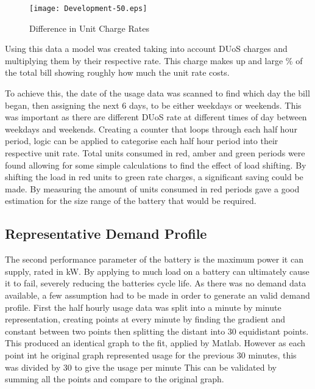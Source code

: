 \begin{figure}[H]
 \centering
 \texttt{[image: Development-50.eps]}
 \caption{Difference in Unit Charge Rates}
 \label{Development-50}
 \end{figure}

Using this data a model was created taking into account DUoS charges and
multiplying them by their respective rate. This charge makes up and
large \% of the total bill showing roughly how much the unit rate costs.

To achieve this, the date of the usage data was scanned to find which
day the bill began, then assigning the next 6 days, to be either
weekdays or weekends. This was important as there are different DUoS
rate at different times of day between weekdays and weekends. Creating a
counter that loops through each half hour period, logic can be applied
to categorise each half hour period into their respective unit rate.
Total units consumed in red, amber and green periods were found allowing
for some simple calculations to find the effect of load shifting. By
shifting the load in red units to green rate charges, a significant
saving could be made. By measuring the amount of units consumed in red
periods gave a good estimation for the size range of the battery that
would be required.

\subsection{Representative Demand
Profile}\label{representative-demand-profile}

The second performance parameter of the battery is the maximum power it
can supply, rated in kW. By applying to much load on a battery can
ultimately cause it to fail, severely reducing the batteries cycle life.
As there was no demand data available, a few assumption had to be made
in order to generate an valid demand profile. First the half hourly
usage data was split into a minute by minute representation, creating
points at every minute by finding the gradient and constant between two
points then splitting the distant into 30 equidistant points. This
produced an identical graph to the fit, applied by Matlab. However as
each point int he original graph represented usage for the previous 30
minutes, this was divided by 30 to give the usage per minute This can be
validated by summing all the points and compare to the original graph.

